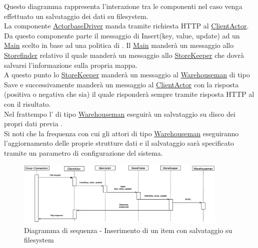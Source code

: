 \documentclass{scalatekids-article}
\begin{document}
Questo diagramma rappresenta l'interazione tra le componenti nel caso venga
effettuato un salvataggio dei dati su filesystem.\\
La componente \hyperref[sec:actorbase::driver::ActorbaseDriver]{ActorbaseDriver}
manda tramite richiesta HTTP al \hyperref[sec:actorbase::actorsystem::actors::clientactor::ClientActor]{ClientActor}.\\
Da questo componente parte il messaggio di Insert(key, value, update) ad un \hyperref[sec:actorbase::actorsystem::actors::main::Main]{Main} scelto in base ad una
politica di . Il \hyperref[sec:actorbase::actorsystem::actors::main::Main]{Main} manderà un messaggio allo
\hyperref[sec:actorbase::actorsystem::actors::storefinder::Storefinder]{Storefinder} relativo il quale manderà un messaggio
allo \hyperref[sec:actorbase::actorsystem::actors::storekeeper::StoreKeeper]{StoreKeeper} che dovrà salvarsi l'informazione sulla propria mappa.\\
A questo punto lo \hyperref[sec:actorbase::actorsystem::actors::storekeeper::StoreKeeper]{StoreKeeper} manderà un messaggio al
\hyperref[sec:actorbase::actorsystem::actors::warehouseman::Warehouseman]{Warehouseman} di tipo Save e
successivamente manderà un messaggio al \hyperref[sec:actorbase::actorsystem::actors::clientactor::ClientActor]{ClientActor} con la risposta
(positiva o negativa che sia) il quale risponderà sempre tramite risposta HTTP al  con il risultato.\\
Nel frattempo l' di tipo \hyperref[sec:actorbase::actorsystem::actors::warehouseman::Warehouseman]{Warehouseman} eseguirà un salvataggio
su disco dei propri dati previa .\\
Si noti che la frequenza con cui gli attori di tipo \hyperref[sec:actorbase::actorsystem::actors::warehouseman::Warehouseman]{Warehouseman} eseguiranno
l'aggiornamento delle proprie strutture dati e il salvataggio sarà specificato
tramite un parametro di configurazione del sistema.\\
\begin{figure}[H]
  \begin{center}
    \includegraphics[width=0.9\textwidth, keepaspectratio]{img/diagrammiSequenza/esempioSave.png}
    \caption{Diagramma di sequenza - Inserimento di un item con salvataggio su filesystem}
  \end{center}
\end{figure}
\end{document}
